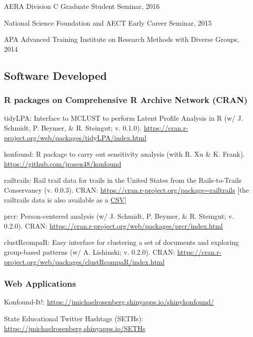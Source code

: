 \documentclass[]{article}
\begin{document}
AERA Division C Graduate Student Seminar, 2016

National Science Foundation and AECT Early Career Seminar, 2015

APA Advanced Training Institute on Research Methods with Diverse Groups,
2014

\hypertarget{software-developed}{%
\subsection{Software Developed}\label{software-developed}}

\hypertarget{r-packages-on-comprehensive-r-archive-network-cran}{%
\subsubsection{R packages on Comprehensive R Archive Network
(CRAN)}\label{r-packages-on-comprehensive-r-archive-network-cran}}

tidyLPA: Interface to MCLUST to perform Latent Profile Analysis in R (w/
J. Schmidt, P. Beymer, \& R. Steingut; v. 0.1.0).
\url{https://cran.r-project.org/web/packages/tidyLPA/index.html}

konfound: R package to carry out sensitivity analysis (with R. Xu \& K.
Frank). \url{https://github.com/jrosen48/konfound}

railtrails: Rail trail data for trails in the United States from the
Rails-to-Trails Conservancy (v. 0.0.3). CRAN:
\url{https://cran.r-project.org/package=railtrails} {[}the railtrails
data is also available as a \href{/_media/data/railtrails.csv}{CSV}{]}

prcr: Person-centered analysis (w/ J. Schmidt, P. Beymer, \& R.
Steingut; v. 0.2.0). CRAN:
\url{https://cran.r-project.org/web/packages/prcr/index.html}

clustRcompaR: Easy interface for clustering a set of documents and
exploring group-based patterns (w/ A. Lishinski; v. 0.2.0). CRAN:
\url{https://cran.r-project.org/web/packages/clustRcompaR/index.html}

\hypertarget{web-applications}{%
\subsubsection{Web Applications}\label{web-applications}}

Konfound-It!:
\url{https://jmichaelrosenberg.shinyapps.io/shinykonfound/}

State Educational Twitter Hashtags (SETHs):
\href{https://jmichaelrosenberg.shinyapps.io/SETHs/}{https://jmichaelrosenberg.shinyapps.io/SETHs}
\end{document}
